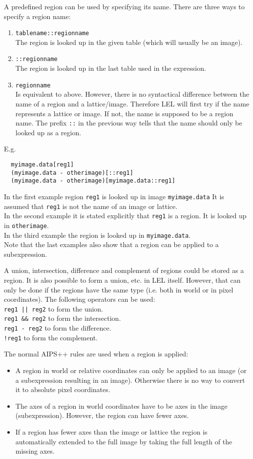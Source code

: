 A predefined region can be used by specifying its name.
There are three ways to specify a region name:
\begin{enumerate}
\item \texttt{tablename::regionname}
  \\The region is looked up in the given table (which will
  usually be an image).
\item \texttt{::regionname}
  \\The region is looked up in the last table used in the expression.
\item \texttt{regionname}
  \\Is equivalent to above. However, there is no syntactical
  difference between the name of a region and a lattice/image.
  Therefore LEL will first try if the name represents a lattice or
  image. If not, the name is supposed to be a region name.
  The prefix \texttt{::} in the previous way tells that the name
  should only be looked up as a region.
\end{enumerate}
E.g.
\begin{verbatim}
  myimage.data[reg1]
  (myimage.data - otherimage)[::reg1]
  (myimage.data - otherimage)[myimage.data::reg1]
\end{verbatim}
In the first example region \texttt{reg1} is looked up in image
\texttt{myimage.data} It is assumed that \texttt{reg1} is not the
name of an image or lattice.
\\In the second example it is stated explicitly that \texttt{reg1}
is a region. It is looked up in \texttt{otherimage}.
\\In the third example the region is looked up in \texttt{myimage.data}.
\\Note that the last examples also show that a region can be applied
to a subexpression.

A union, intersection, difference and complement of regions
could be stored as a region. It is also possible to form a union,
etc. in LEL itself. However, that can only be done if the regions
have the same type (i.e. both in world or in pixel coordinates).
The following operators can be used:
\\ \texttt{reg1 || reg2} to form the union.
\\ \texttt{reg1 \&\& reg2} to form the intersection.
\\ \texttt{reg1 - reg2} to form the difference.
\\ \texttt{!reg1} to form the complement.

The normal AIPS++ rules are used when a region is applied:
\begin{itemize}
\item A region in world or relative coordinates can only be applied
to an image (or a subexpression resulting in an image). Otherwise
there is no way to convert it to absolute pixel coordinates.
\item The axes of a region in world coordinates have to be axes in
the image (subexpression). However, the region can have fewer axes.
\item If a region has fewer axes than the image or lattice
the region is automatically extended to the full image
by taking the full length of the missing axes.
\end{itemize}

